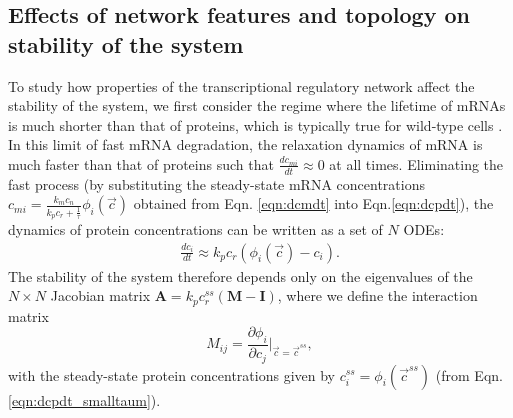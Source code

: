 \documentclass[10pt]{article}
\begin{document}
\subsection*{Effects of network features and topology on stability of the system}
To study how properties of the transcriptional regulatory network affect the stability of the system, we first consider the regime where the lifetime of mRNAs is much shorter than that of proteins, which is typically true for wild-type cells \cite{milo2015cell}. In this limit of fast mRNA degradation, the relaxation dynamics of mRNA is much faster than that of proteins such that $\frac{dc_{mi}}{dt} \approx 0$ at all times. Eliminating the fast process (by substituting the steady-state mRNA concentrations $ c_{mi} = \frac{k_m c_{n}}{k_p c_{r} + \frac{1}{\tau}} \phi_i(\vec{c}) $ obtained from Eqn. \ref{eqn:dcmdt} into 
Eqn.\ref{eqn:dcpdt}), the dynamics of protein concentrations can be written as a set of $N$ ODEs:
\begin{align}
    \frac{dc_i}{dt}  \approx k_p c_r \left( \phi_i(\vec{c}) - c_i \right). 
    \label{eqn:dcpdt_smalltaum}
\end{align}
The stability of the system therefore depends only on the eigenvalues of the $N \times N$ Jacobian matrix $\mathbf{A} = k_p c_r^{ss} (\mathbf{M}-\mathbf{I})$, where we define the interaction matrix
\begin{equation}
 M_{ij} = \frac{\partial \phi_i}{\partial c_j}\vert_{\vec{c}={\vec{c}^{ss}}},
 \label{eqn:Mmatrix}
\end{equation}
with the steady-state protein concentrations given by $c_i^{ss} = \phi_i(\vec{c}^{ss})$ (from Eqn. \ref{eqn:dcpdt_smalltaum}).
\end{document}
